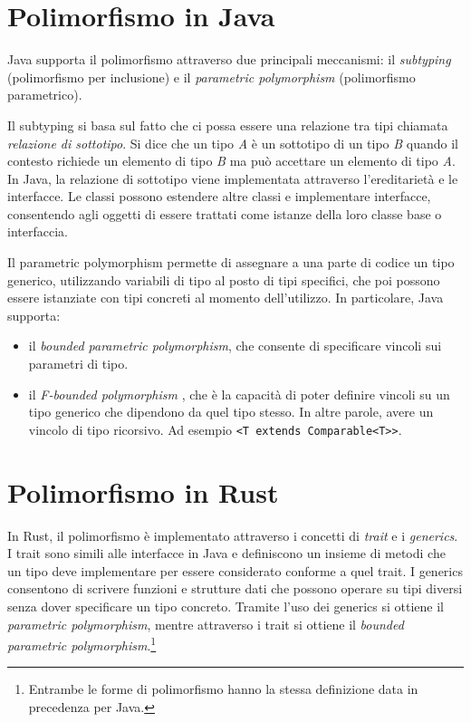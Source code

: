 \section{Polimorfismo in Java}
Java supporta il polimorfismo attraverso due principali meccanismi: il \textit{subtyping} (polimorfismo per inclusione) e il \textit{parametric polymorphism} (polimorfismo parametrico). 

Il subtyping si basa sul fatto che ci possa essere una relazione tra tipi chiamata \textit{relazione di sottotipo}. Si dice che un tipo \textit{A} è un sottotipo di un tipo \textit{B} quando il contesto richiede un elemento di tipo \textit{B} ma può accettare un elemento di tipo \textit{A}. In Java, la relazione di sottotipo viene implementata attraverso l'ereditarietà e le interfacce. Le classi possono estendere altre classi e implementare interfacce, consentendo agli oggetti di essere trattati come istanze della loro classe base o interfaccia. 

Il parametric polymorphism permette di assegnare a una parte di codice un tipo generico, utilizzando variabili di tipo al posto di tipi specifici, che poi possono essere istanziate con tipi concreti al momento dell'utilizzo. In particolare, Java supporta:
\begin{itemize}
    \item il \textit{bounded parametric polymorphism}, che consente di specificare vincoli sui parametri di tipo.
    \item il \textit{F-bounded polymorphism} \cite{greenman-effing-bound-polymorphism}, che è la capacità di poter definire vincoli su un tipo generico che dipendono da quel tipo stesso. In altre parole, avere un vincolo di tipo ricorsivo. Ad esempio \texttt{<T extends Comparable<T>}\texttt{>}.
\end{itemize}
\section{Polimorfismo in Rust}
In Rust, il polimorfismo è implementato attraverso i concetti di \textit{trait} e i \textit{generics}. I trait sono simili alle interfacce in Java e definiscono un insieme di metodi che un tipo deve implementare per essere considerato conforme a quel trait. I generics consentono di scrivere funzioni e strutture dati che possono operare su tipi diversi senza dover specificare un tipo concreto. Tramite l'uso dei generics si ottiene il \textit{parametric polymorphism}, mentre attraverso i trait si ottiene il \textit{bounded parametric polymorphism}.\footnote{Entrambe le forme di polimorfismo hanno la stessa definizione data in precedenza per Java.}

